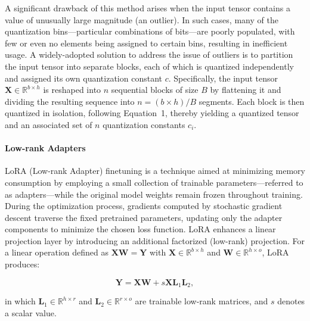 A significant drawback of this method arises when the input tensor contains a value of unusually large magnitude (an outlier). In such cases, many of the quantization bins—particular combinations of bits—are poorly populated, with few or even no elements being assigned to certain bins, resulting in inefficient usage. A widely-adopted solution to address the issue of outliers is to partition the input tensor into separate blocks, each of which is quantized independently and assigned its own quantization constant $c$. Specifically, the input tensor $\mathbf{X}\in \mathbb{R}^{b\times h}$ is reshaped into $n$ sequential blocks of size $B$ by flattening it and dividing the resulting sequence into $n = ({b\times h} )/{B}$ segments. Each block is then quantized in isolation, following Equation~1, thereby yielding a quantized tensor and an associated set of $n$ quantization constants $c_i$.

\paragraph{Low-rank Adapters} LoRA (Low-rank Adapter) finetuning \citep{hu2021lora} is a technique aimed at minimizing memory consumption by employing a small collection of trainable parameters—referred to as adapters—while the original model weights remain frozen throughout training. During the optimization process, gradients computed by stochastic gradient descent traverse the fixed pretrained parameters, updating only the adapter components to minimize the chosen loss function. LoRA enhances a linear projection layer by introducing an additional factorized (low-rank) projection. For a linear operation defined as ${\mathbf{X} \mathbf{W} = \mathbf{Y}}$ with $\mathbf{X}\in  \mathbb{R}^{b\times h}$ and $\mathbf{W}\in  \mathbb{R}^{h\times o}$, LoRA produces:

\begin{equation}
    \mathbf{Y} = \mathbf{X}\mathbf{W} + s\mathbf{X}\mathbf{L}_1\mathbf{L}_2,
\end{equation}

in which $\mathbf{L}_1\in  \mathbb{R}^{h\times r}$ and $\mathbf{L}_2\in  \mathbb{R}^{r\times o}$ are trainable low-rank matrices, and $s$ denotes a scalar value.

